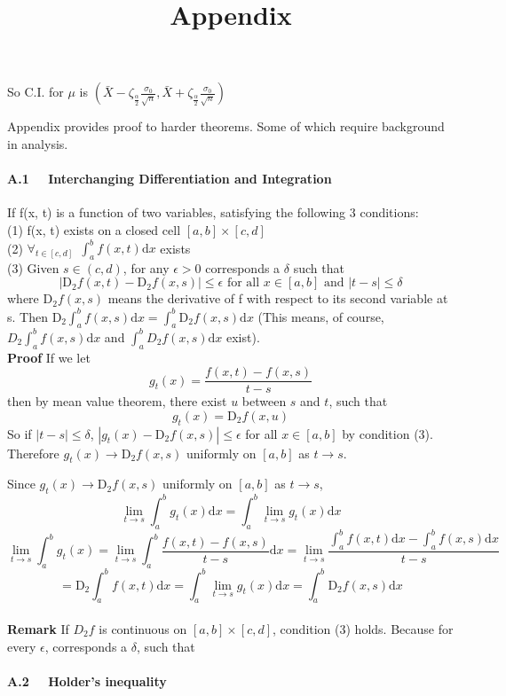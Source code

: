 \documentclass[a4paper,12pt]{article}
\begin{document}
So C.I. for $\mu$ is $(\bar{X}- \zeta_{\frac{\alpha}{2}} \frac{\sigma_0}{\sqrt{n}},
\bar{X} + \zeta_{\frac{\alpha}{2}} \frac{\sigma_0}{\sqrt{n}})$



\newpage
\title{\textbf{{\LARGE Appendix\\}}}

Appendix provides proof to harder theorems. Some of which require background in analysis.\\


\paragraph{ A.1 \ \  Interchanging Differentiation and Integration}
If f(x, t) is a function of two variables, satisfying the following 3 conditions:\\
(1) f(x, t) exists on a closed cell $[a, b] \times [c, d]$\\
(2) $\forall_{t\in[c, d] }\ \ \int_a^b f(x, t) \mathrm{d}x$ exists\\
(3) Given $s \in (c, d)$, for any $\epsilon > 0$ corresponds a $\delta$ such that $$ | \mathrm{D}_2 f(x, t) - \mathrm{D}_2 f(x, s) | \leq \epsilon \text{ for all } x \in [a, b] \text{ and } | t - s | \leq \delta $$
where $\mathrm{D}_2 f(x, s)$ means the derivative of f with respect to its second variable at s.
Then $\mathrm{D}_2 \int_a^b f(x, s) \mathrm{d}x = \int_a^b \mathrm{D}_2 f(x, s) \mathrm{d}x$ (This means, of course, $D_2 \int_a^b f(x, s) \mathrm{d}x $ and $ \int_a^b D_2 f(x, s) \mathrm{d}x$ exist).\\

\textbf{Proof} If we let
$$g_t(x) = \frac{f(x, t)-f(x, s)}{t-s}$$
then by mean value theorem, there exist $u$ between $s$ and $t$, such that
$$g_t(x)= \mathrm{D}_2 f(x, u)$$
So if $|t-s|\leq\delta$, $ |g_t(x) - \mathrm{D}_2 f(x, s) | \leq \epsilon $ for all $x \in [a, b]$ by condition (3). Therefore $g_t(x)\to \mathrm{D}_2 f(x, s)$ uniformly on $[a, b]$ as $t\to s$.

Since $g_t(x)\to \mathrm{D}_2 f(x, s)$ uniformly on $[a, b]$ as $t\to s$,
$$\lim_{t\to s}\int_a^b g_t(x) \mathrm{d}x = \int_a^b \lim_{t\to s} g_t(x) \mathrm{d}x $$
$$\lim_{t\to s}\int_a^b g_t(x) = \lim_{t\to s}\int_a^b \frac{f(x, t)-f(x, s)}{t-s} \mathrm{d}x = \lim_{t\to s} \frac{\int_a^b f(x, t) \mathrm{d}x - \int_a^b f(x, s) \mathrm{d}x}{t-s}$$
$$ = \mathrm{D}_2 \int_a^b f(x, t) \mathrm{d}x
= \int_a^b \lim_{t\to s} g_t(x) \mathrm{d}x = \int_a^b \mathrm{D}_2 f(x, s) \mathrm{d}x $$\\

\textbf{Remark}
If $D_2 f$ is continuous on $[a, b]\times [c, d]$, condition (3) holds. Because for every $\epsilon$, corresponds a $\delta$, such that

\paragraph{ A.2 \ \  Holder's inequality\\}
\end{document}
